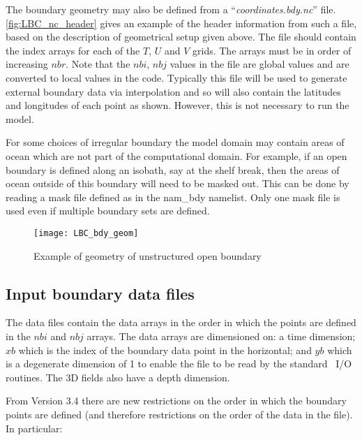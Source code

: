 \documentclass[../main/NEMO_manual]{subfiles}
\begin{document}
The boundary geometry may also be defined from a ``\textit{coordinates.bdy.nc}'' file.
\autoref{fig:LBC_nc_header} gives an example of the header information from such a file, based on the description of geometrical setup given above.
The file should contain the index arrays for each of the $T$, $U$ and $V$ grids.
The arrays must be in order of increasing $nbr$.
Note that the $nbi$, $nbj$ values in the file are global values and are converted to local values in the code.
Typically this file will be used to generate external boundary data via interpolation and so
will also contain the latitudes and longitudes of each point as shown.
However, this is not necessary to run the model.

For some choices of irregular boundary the model domain may contain areas of ocean which
are not part of the computational domain.
For example, if an open boundary is defined along an isobath, say at the shelf break,
then the areas of ocean outside of this boundary will need to be masked out.
This can be done by reading a mask file defined as  in the nam\_bdy namelist.
Only one mask file is used even if multiple boundary sets are defined.

\begin{figure}[!t]
  \centering
  \texttt{[image: LBC\_bdy\_geom]}
  \caption[Geometry of unstructured open boundary]{Example of geometry of unstructured open boundary}
  \label{fig:LBC_bdy_geom}
\end{figure}

\subsection{Input boundary data files}
\label{subsec:LBC_bdy_data}

The data files contain the data arrays in the order in which the points are defined in the $nbi$ and $nbj$ arrays.
The data arrays are dimensioned on:
a time dimension;
$xb$ which is the index of the boundary data point in the horizontal;
and $yb$ which is a degenerate dimension of 1 to enable the file to be read by the standard \NEMO\ I/O routines.
The 3D fields also have a depth dimension.

From Version 3.4 there are new restrictions on the order in which the boundary points are defined
(and therefore restrictions on the order of the data in the file).
In particular:
\end{document}
